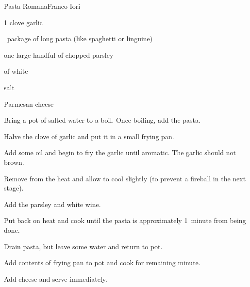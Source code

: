 \begin{recipe}{Pasta Romana}{Franco Iori}{}

\begin{ingredients}
\item 1 clove garlic
\item \half{}~package of long pasta (like spaghetti or linguine)
\item one large handful of chopped parsley
\item \C{\half} of white 
\item {}
\item salt
\item Parmesan cheese
\end{ingredients}

\begin{directions}
\item Bring a pot of salted water to a boil. Once boiling, add the pasta.
\item Halve the clove of garlic and put it in a small frying pan.
\item Add some oil and begin to fry the garlic until aromatic. The garlic should not brown.
\item Remove from the heat and allow to cool slightly (to prevent a fireball in the next stage).
\item Add the parsley and white wine.
\item Put back on heat and cook until the pasta is approximately 1~minute from being done.
\item Drain pasta, but leave some water and return to pot.
\item Add contents of frying pan to pot and cook for remaining minute.
\item Add cheese and serve immediately.
\end{directions}

\end{recipe}
